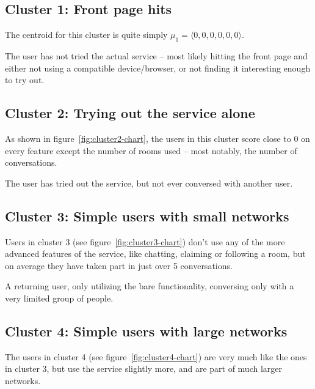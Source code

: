 \subsection{Cluster 1: Front page hits}

The centroid for this cluster is quite simply $\mu_1 = \langle 0, 0, 0, 0, 0, 0 \rangle$.

\begin{persona}
  The user has not tried the actual service -- most likely hitting the front page and either not using a compatible device/browser, or not finding it interesting enough to try out.
\end{persona}

\subsection{Cluster 2: Trying out the service alone}

As shown in figure~\ref{fig:cluster2-chart}, the users in this cluster score close to 0 on every feature except the number of rooms used -- most notably, the number of conversations.

\begin{persona}
  The user has tried out the service, but not ever conversed with another user.
\end{persona}

\subsection{Cluster 3: Simple users with small networks}

Users in cluster 3 (see figure~\ref{fig:cluster3-chart}) don't use any of the more advanced features of the service, like chatting, claiming or following a room, but on average they have taken part in just over 5 conversations.

\begin{persona}
  A returning user, only utilizing the bare functionality, conversing only with a very limited group of people.
\end{persona}

\subsection{Cluster 4: Simple users with large networks}

The users in cluster 4 (see figure~\ref{fig:cluster4-chart}) are very much like the ones in cluster 3, but use the service slightly more, and are part of much larger networks.


